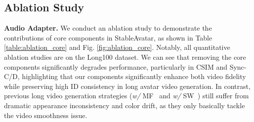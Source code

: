 \begin{table}[t!]\small
\caption{Ablation study on core components. MF and SW are motion frame~\cite{cui2025hallo3} and conventional sliding-window~\cite{ji2025sonic}, which are both based on \textit{w/o} Audio Adapter.
}
\vspace{-0.25in}
\begin{center}
\renewcommand\arraystretch{1.1}
\end{center}
\label{table:ablation_core}
\vspace{-0.3in}
\end{table}

\subsection{Ablation Study}

\textbf{Audio Adapter.}
We conduct an ablation study to demonstrate the contributions of core components in StableAvatar, as shown in Table \ref{table:ablation_core} and Fig. \ref{fig:ablation_core}. Notably, all quantitative ablation studies are on the Long100 dataset. We can see that removing the core components significantly degrades performance, particularly in CSIM and Sync-C/D, highlighting that our components significantly enhance both video fidelity while preserving high ID consistency in long avatar video generation. In contrast, previous long video generation strategies (\textit{w/} MF~\cite{cui2025hallo3} and \textit{w/} SW~\cite{ji2025sonic}) still suffer from dramatic appearance inconsistency and color drift, as they only basically tackle the video smoothness issue.

